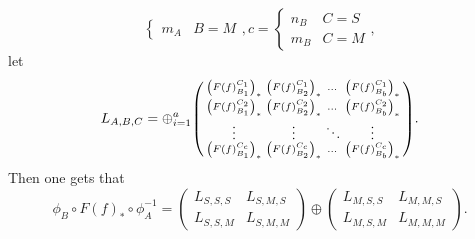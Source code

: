 \begin{remark}
\[\begin{cases}
            m_A & B = M
        \end{cases},
        c =
        \begin{cases}
            n_B & C = S \\
            m_B & C = M
        \end{cases},
    \]
    let
    \[
        L_{A, B, C} = \oplus_{i = 1}^{a}
        \begin{psmallmatrix}
            \left(  F(f)_{B_1}^{C_1}  \right)_* &
            \left(  F(f)_{B_2}^{C_1}  \right)_* &
            \dots &
            \left(  F(f)_{B_b}^{C_1}  \right)_* \\
            \left(  F(f)_{B_1}^{C_2}  \right)_* &
            \left(  F(f)_{B_2}^{C_2}  \right)_* &
            \dots &
            \left(  F(f)_{B_b}^{C_2}  \right)_* \\
            \vdots & \vdots & \ddots & \vdots \\
            \left(  F(f)_{B_1}^{C_c}  \right)_* &
            \left(  F(f)_{B_2}^{C_c}  \right)_* &
            \dots &
            \left(  F(f)_{B_b}^{C_c}  \right)_* \\
        \end{psmallmatrix}.
    \]
    Then one gets that
    \[
        \phi_B \circ F(f)_* \circ \phi_A^{-1} =
        \begin{pmatrix}
            L_{S, S, S} & L_{S, M, S} \\
            L_{S, S, M } & L_{S, M, M}
        \end{pmatrix}
        \oplus
        \begin{pmatrix}
            L_{M, S, S} & L_{M, M, S} \\
            L_{M, S, M} & L_{M, M, M}
        \end{pmatrix}.
    \]
    



\end{remark}
